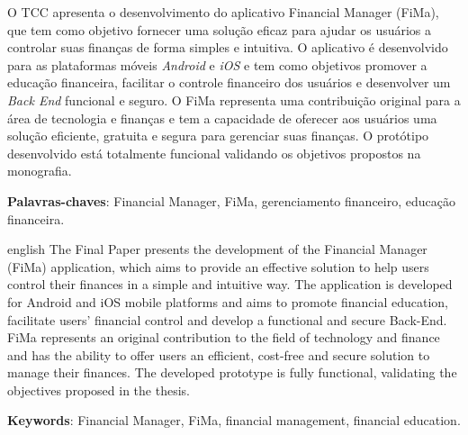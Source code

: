 
\setlength{\absparsep}{18pt} %
\begin{resumo}[Resumo]

O TCC apresenta o desenvolvimento do aplicativo Financial Manager (FiMa), que tem como objetivo fornecer uma solução eficaz para ajudar os usuários a controlar suas finanças de forma simples e intuitiva. O aplicativo é desenvolvido para as plataformas móveis \textit{Android} e \textit{iOS} e tem como objetivos promover a educação financeira, facilitar o controle financeiro dos usuários e desenvolver um \textit{Back End} funcional e seguro. O FiMa representa uma contribuição original para a área de tecnologia e finanças e tem a capacidade de oferecer aos usuários uma solução eficiente, gratuita e segura para gerenciar suas finanças. O protótipo desenvolvido está totalmente funcional validando os objetivos propostos na monografia.

 \textbf{Palavras-chaves}: Financial Manager, FiMa, gerenciamento financeiro, educação financeira.
\end{resumo}

\begin{resumo}[Abstract]
 \begin{otherlanguage*}{english}
  The Final Paper presents the development of the Financial Manager (FiMa) application, which aims to provide an effective solution to help users control their finances in a simple and intuitive way. The application is developed for Android and iOS mobile platforms and aims to promote financial education, facilitate users’ financial control and develop a functional and secure Back-End. FiMa represents an original contribution to the field of technology and finance and has the ability to offer users an efficient, cost-free and secure solution to manage their finances. The developed prototype is fully functional, validating the objectives proposed in the thesis.

   \vspace{\onelineskip}
 
   \noindent 
   \textbf{Keywords}: Financial Manager, FiMa, financial management, financial education.
 \end{otherlanguage*}
\end{resumo}